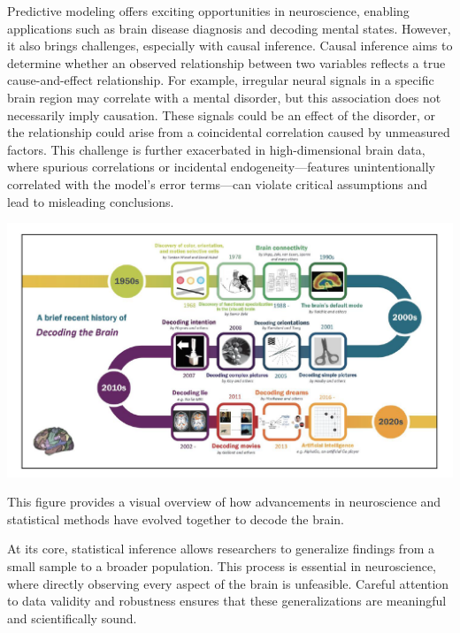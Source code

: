 \documentclass[
]{article}
\begin{document}
Predictive modeling offers exciting opportunities in neuroscience,
enabling applications such as brain disease diagnosis and decoding
mental states. However, it also brings challenges, especially with
causal inference. Causal inference aims to determine whether an observed
relationship between two variables reflects a true cause-and-effect
relationship. For example, irregular neural signals in a specific brain
region may correlate with a mental disorder, but this association does
not necessarily imply causation. These signals could be an effect of the
disorder, or the relationship could arise from a coincidental
correlation caused by unmeasured factors. This challenge is further
exacerbated in high-dimensional brain data, where spurious correlations
or incidental endogeneity---features unintentionally correlated with the
model's error terms---can violate critical assumptions and lead to
misleading conclusions.

\includegraphics{stat_developments_history.png}

This figure provides a visual overview of how advancements in
neuroscience and statistical methods have evolved together to decode the
brain.

At its core, statistical inference allows researchers to generalize
findings from a small sample to a broader population. This process is
essential in neuroscience, where directly observing every aspect of the
brain is unfeasible. Careful attention to data validity and robustness
ensures that these generalizations are meaningful and scientifically
sound.
\end{document}
